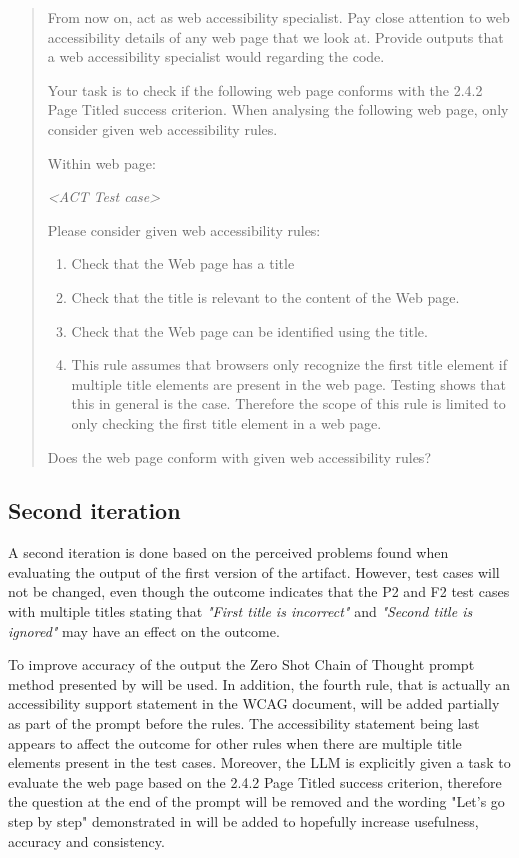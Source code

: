 \begin{quote}\label{first_iteration}
From now on, act as web accessibility specialist. Pay close attention to web accessibility details of any web page that we look at. Provide outputs that a web accessibility specialist would regarding the code.

Your task is to check if the following web page conforms with the 2.4.2 Page Titled success criterion.
When analysing the following web page, only consider given web accessibility rules.

Within web page:

\textit{<ACT Test case>}

Please consider given web accessibility rules:

\begin{enumerate}
    \item Check that the Web page has a title
    \item Check that the title is relevant to the content of the Web page.
    \item Check that the Web page can be identified using the title.
    \item This rule assumes that browsers only recognize the first title element if multiple title elements are present in the web page. Testing shows that this in general is the case. Therefore the scope of this rule is limited to only checking the first title element in a web page.
\end{enumerate}

Does the web page conform with given web accessibility rules?
\end{quote}

\subsection{Second iteration}

A second iteration is done based on the perceived problems found when evaluating the output of the first version of the artifact. However, test cases will not be changed, even though the outcome indicates that the P2 and F2 test cases with multiple titles stating that \textit{"First title is incorrect"} and \textit{"Second title is ignored"} may have an effect on the outcome.

To improve accuracy of the output the Zero Shot Chain of Thought prompt method presented by \textcite{kojima2023large} will be used. In addition, the fourth rule, that is actually an accessibility support statement in the WCAG \textcite{act_rule_g88} document, will be added partially as part of the prompt before the rules. The accessibility statement being last appears to affect the outcome for other rules when there are multiple title elements present in the test cases. Moreover, the LLM is explicitly given a task to evaluate the web page based on the 2.4.2 Page Titled success criterion, therefore the question at the end of the prompt will be removed and the wording "Let's go step by step" demonstrated in \textcite{kojima2023large} will be added to hopefully increase usefulness, accuracy and consistency.

